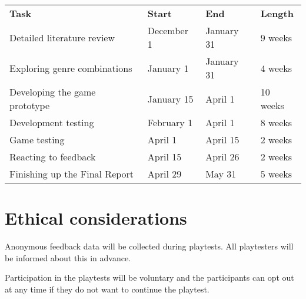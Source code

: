 \begin{center}
    \begin{tabular}{ l l l l }
        \textbf{Task}                   & \textbf{Start} & \textbf{End} & \textbf{Length} \\
        Detailed literature review      & December 1     & January  31  & 9 weeks         \\
        Exploring genre combinations    & January 1      & January 31   & 4 weeks         \\
        Developing the game prototype   & January 15     & April 1      & 10 weeks        \\
        Development testing             & February 1     & April 1      & 8 weeks         \\
        Game testing                    & April 1        & April 15     & 2 weeks         \\
        Reacting to feedback            & April 15       & April 26     & 2 weeks         \\
        Finishing up the Final Report   & April 29       & May 31       & 5 weeks         \\
    \end{tabular}
\end{center}



\section{Ethical considerations}

Anonymous feedback data will be collected during playtests. All playtesters will be informed about this in advance. 

Participation in the playtests will be voluntary and the participants can opt out at any time if they do not want to continue the playtest.